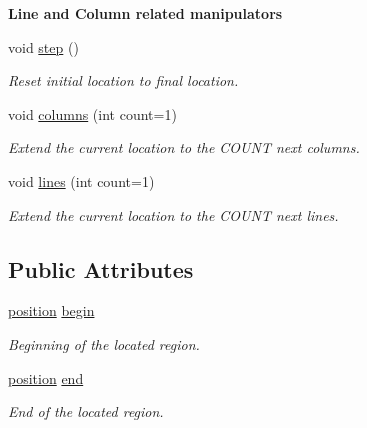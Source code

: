 \begin{Indent}{\bf Line and Column related manipulators}\par
\begin{DoxyCompactItemize}
\item 
void \hyperlink{classyy_1_1location_a96620cec8dd8ebfc96c60a03c10154d0}{step} ()\hypertarget{classyy_1_1location_a96620cec8dd8ebfc96c60a03c10154d0}{}\label{classyy_1_1location_a96620cec8dd8ebfc96c60a03c10154d0}

\begin{DoxyCompactList}\small\item\em Reset initial location to final location. \end{DoxyCompactList}\item 
void \hyperlink{classyy_1_1location_ae232b2eb7ad3aed7f5c2b080d64d931d}{columns} (int count=1)\hypertarget{classyy_1_1location_ae232b2eb7ad3aed7f5c2b080d64d931d}{}\label{classyy_1_1location_ae232b2eb7ad3aed7f5c2b080d64d931d}

\begin{DoxyCompactList}\small\item\em Extend the current location to the C\+O\+U\+NT next columns. \end{DoxyCompactList}\item 
void \hyperlink{classyy_1_1location_aca7f94cd71a67d27f1c90e54d8cd4ff6}{lines} (int count=1)\hypertarget{classyy_1_1location_aca7f94cd71a67d27f1c90e54d8cd4ff6}{}\label{classyy_1_1location_aca7f94cd71a67d27f1c90e54d8cd4ff6}

\begin{DoxyCompactList}\small\item\em Extend the current location to the C\+O\+U\+NT next lines. \end{DoxyCompactList}\end{DoxyCompactItemize}
\end{Indent}
\subsection*{Public Attributes}
\begin{DoxyCompactItemize}
\item 
\hyperlink{classyy_1_1position}{position} \hyperlink{classyy_1_1location_a70540e90479a85db4112b552d7e032cf}{begin}\hypertarget{classyy_1_1location_a70540e90479a85db4112b552d7e032cf}{}\label{classyy_1_1location_a70540e90479a85db4112b552d7e032cf}

\begin{DoxyCompactList}\small\item\em Beginning of the located region. \end{DoxyCompactList}\item 
\hyperlink{classyy_1_1position}{position} \hyperlink{classyy_1_1location_aa9be2a89fdb63da08167ebd4b819addd}{end}\hypertarget{classyy_1_1location_aa9be2a89fdb63da08167ebd4b819addd}{}\label{classyy_1_1location_aa9be2a89fdb63da08167ebd4b819addd}

\begin{DoxyCompactList}\small\item\em End of the located region. \end{DoxyCompactList}\end{DoxyCompactItemize}


